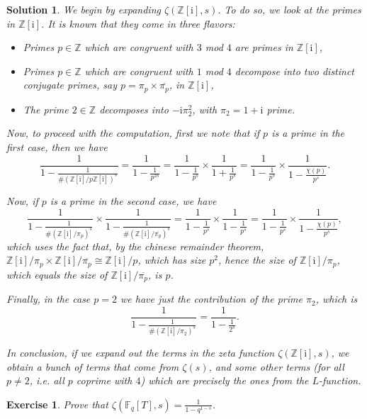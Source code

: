\documentclass{article}
\newtheorem{ex}{Exercise}
\theoremstyle{nonumberplain}
\newtheorem{sol}{Solution}
\newcommand{\Z}{\mathbb{Z}}
\newcommand{\FF}{\mathbb{F}}
\newcommand{\I}{\mathrm{i}}
\newcommand{\conj}[1]{\overline{#1}}
\begin{document}
\begin{sol}
We begin by expanding $\zeta(\Z[\I],s)$. To do so, we look at the primes in $\Z[\I]$. It is known that they come in three flavors:
\begin{itemize}
\item Primes $p \in \Z$ which are congruent with $3$ mod $4$ are primes in $\Z[\I]$,
\item Primes $p \in \Z$ which are congruent with $1$ mod $4$ decompose into two distinct conjugate primes, say $p = \pi_p \times \conj{\pi_p}$, in $\Z[\I]$,
\item The prime $2 \in \Z$ decomposes into $- \I \pi_2^2$, with $\pi_2 = 1 + \I$ prime.
\end{itemize}

Now, to proceed with the computation, first we note that if $p$ is a prime in the first case, then we have
\begin{equation}
\frac1{1-\frac1{\#(\Z[\I]/p\Z[\I])^s}} = \frac1{1-\frac1{p^{2s}}} = \frac1{1-\frac1{p^s}} \times \frac1{1+\frac1{p^s}} = \frac1{1-\frac1{p^s}} \times \frac1{1-\frac{\chi(p)}{p^s}}.
\end{equation}

Now, if $p$ is a prime in the second case, we have
\begin{equation}
\frac1{1-\frac1{\#(\Z[\I]/\pi_p)^s}} \times \frac1{1-\frac1{\#(\Z[\I]/\conj{\pi_p})^s}} = \frac1{1-\frac1{p^s}} \times \frac1{1-\frac1{p^s}} = \frac1{1-\frac1{p^s}} \times \frac1{1-\frac{\chi(p)}{p^s}},
\end{equation}
which uses the fact that, by the chinese remainder theorem, $\Z[\I]/\pi_p \times \Z[\I]/\conj{\pi_p} \cong \Z[\I]/p$, which has size $p^2$, hence the size of $\Z[\I]/\pi_p$, which equals the size of $\Z[\I]/\conj{\pi_p}$, is $p$.

Finally, in the case $p = 2$ we have just the contribution of the prime $\pi_2$, which is
\begin{equation}
\frac1{1-\frac1{\#(\Z[\I]/\pi_2)^s}} = \frac1{1-\frac1{2^s}}.
\end{equation}

In conclusion, if we expand out the terms in the zeta function $\zeta(\Z[\I], s)$, we obtain a bunch of terms that come from $\zeta(s)$, and some other terms (for all $p \neq 2$, i.e. all $p$ coprime with $4$) which are precisely the ones from the $L$-function.
\end{sol}

\begin{ex}
Prove that $\zeta(\FF_q[T], s) = \frac1{1-q^{1-s}}$.
\end{ex}
\end{document}
